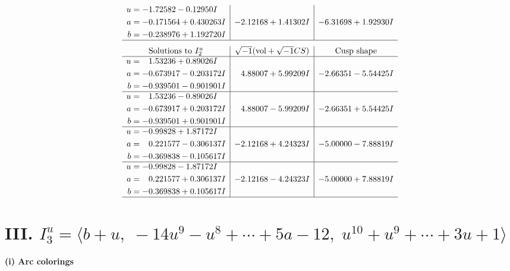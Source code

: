 \documentclass[1p]{elsarticle_modified}
\theoremstyle{definition}
\newcommand{\I}{\sqrt{-1}}
\begin{document}
$$\begin{array}{c|c|c}
\begin{aligned}
u &= -1.72582 - 0.12950 I \\
a &= -0.171564 + 0.430263 I \\
b &= -0.238976 + 1.192720 I\end{aligned}
 & -2.12168 + 1.41302 I & -6.31698 + 1.92930 I\\
 \hline 
 \end{array}$$\newpage$$\begin{array}{c|c|c}  
\text{Solutions to }I^u_{2}& \I (\text{vol} + \sqrt{-1}CS) & \text{Cusp shape}\\
 \hline 
\begin{aligned}
u &= \phantom{-}1.53236 + 0.89026 I \\
a &= -0.673917 - 0.203172 I \\
b &= -0.939501 - 0.901901 I\end{aligned}
 & \phantom{-}4.88007 + 5.99209 I & -2.66351 - 5.54425 I \\ \hline\begin{aligned}
u &= \phantom{-}1.53236 - 0.89026 I \\
a &= -0.673917 + 0.203172 I \\
b &= -0.939501 + 0.901901 I\end{aligned}
 & \phantom{-}4.88007 - 5.99209 I & -2.66351 + 5.54425 I \\ \hline\begin{aligned}
u &= -0.99828 + 1.87172 I \\
a &= \phantom{-}0.221577 - 0.306137 I \\
b &= -0.369838 - 0.105617 I\end{aligned}
 & -2.12168 + 4.24323 I & -5.00000 - 7.88819 I \\ \hline\begin{aligned}
u &= -0.99828 - 1.87172 I \\
a &= \phantom{-}0.221577 + 0.306137 I \\
b &= -0.369838 + 0.105617 I\end{aligned}
 & -2.12168 - 4.24323 I & -5.00000 + 7.88819 I\\
 \hline 
 \end{array}$$\newpage\newpage\renewcommand{\arraystretch}{1}
\centering \section*{III. $I^u_{3}= \langle b+u,\;-14 u^9- u^8+\cdots+5 a-12,\;u^{10}+u^9+\cdots+3 u+1 \rangle$}
\flushleft \textbf{(i) Arc colorings}\\
\end{document}
